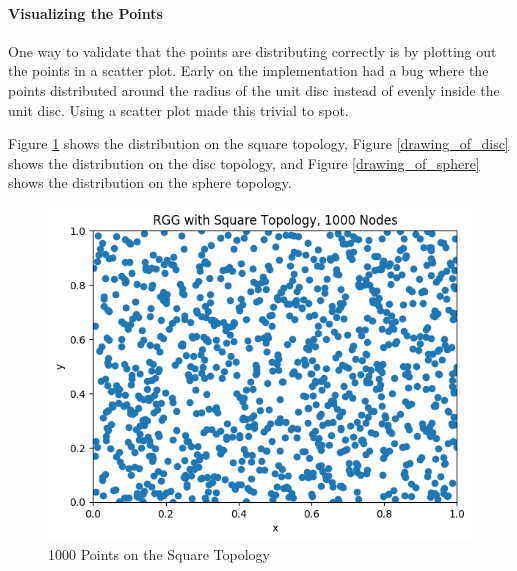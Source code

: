 \documentclass{article}
\begin{document}
  \paragraph{Visualizing the Points}
    One way to validate that the points are distributing correctly is by plotting out the points in a scatter plot.
    Early on the implementation had a bug where the points distributed around the radius of the unit disc instead of evenly inside the unit disc.
    Using a scatter plot made this trivial to spot.

    Figure \ref{drawing_of_square} shows the distribution on the square topology,
    Figure \ref{drawing_of_disc} shows the distribution on the disc topology,
    and Figure \ref{drawing_of_sphere} shows the distribution on the sphere topology.
    \begin{figure}
      \centering
      \label{drawing_of_square}
      \includegraphics[width=1 \textwidth]{square/generation/drawing/nodes.png}
      \caption{1000 Points on the Square Topology}
    \end{figure}
\end{document}
